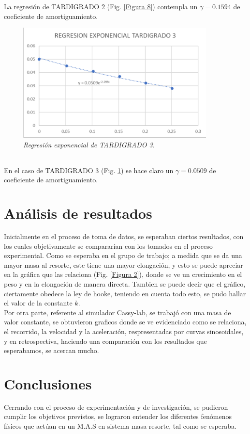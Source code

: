 \documentclass[spanish,notitlepage,letterpaper, 12pt]{article}
\begin{document}
La regresión de TARDIGRADO 2 (Fig. \ref{Figura 8}) contempla un $\gamma=0.1594$ de coeficiente de amortiguamiento.
\begin{figure}[h]
    \centering
    \includegraphics[width=10.0cm]{images/regresion-tardigrado3.png}
    \caption{\textit{Regresión exponencial de TARDIGRADO 3.}}
    \label{Figura 9}
\end{figure}
\\
En el caso de TARDIGRADO 3 (Fig. \ref{Figura 9}) se hace claro un $\gamma=0.0509$ de coeficiente de amortiguamiento.
\section{Análisis de resultados}
Inicialmente en el proceso de toma de datos, se esperaban ciertos resultados, con los cuales objetivamente se compararían con los tomados en el proceso experimental. Como se esperaba en el grupo de trabajo; a medida que se da una mayor masa al resorte, este tiene una mayor elongación, y esto se
puede apreciar en la gráfica que las relaciona (Fig. \ref{Figura 2}), donde se ve un crecimiento en el peso y en la elongación de manera directa. Tambien se puede decir que el gráfico, ciertamente obedece la ley de hooke, teniendo en cuenta todo esto, se pudo hallar el valor de la constante $k$.\\

Por otra parte, referente al simulador Cassy-lab, se trabajó con una masa de valor constante, se obtuvieron graficos donde se ve evidenciado como se relaciona, el recorrido, la velocidad y la aceleración, respresentadas por curvas sinosoidales, y en retrospectiva, haciendo una comparación con los resultados que esperabamos, se acercan mucho.
\section{Conclusiones}
Cerrando con el proceso de experimentación y de investigación, se pudieron cumplir los objetivos previstos, se lograron entender los diferentes fenómenos físicos que actúan en un M.A.S en sistema masa-resorte, tal como se esperaba.\\
\end{document}
